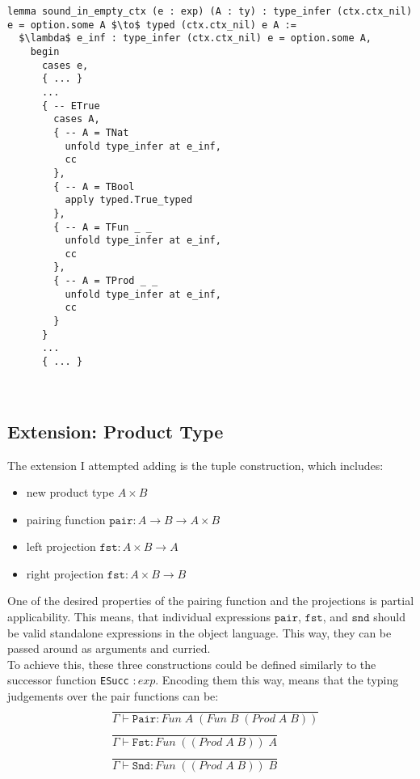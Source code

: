 \documentclass{article}
\newcommand{\tt}[1]{\texttt{#1}}
\begin{document}
\begin{minipage}{\textwidth}
\begin{lstlisting}[mathescape = true, caption={Snippet of the soundness proof in an empty context showing the case for ${\tt{ETrue}}$.}, captionpos=b, label={lst:soundness_etrue}]
lemma sound_in_empty_ctx (e : exp) (A : ty) : type_infer (ctx.ctx_nil) e = option.some A $\to$ typed (ctx.ctx_nil) e A :=
  $\lambda$ e_inf : type_infer (ctx.ctx_nil) e = option.some A,
    begin
      cases e,
      { ... }
      ...
      { -- ETrue
        cases A,
        { -- A = TNat
          unfold type_infer at e_inf,
          cc
        },
        { -- A = TBool
          apply typed.True_typed
        },
        { -- A = TFun _ _
          unfold type_infer at e_inf,
          cc
        },
        { -- A = TProd _ _
          unfold type_infer at e_inf,
          cc
        }
      }
      ...
      { ... }
\end{lstlisting}
\end{minipage} \\


\subsection{Extension: Product Type}
The extension I attempted adding is the tuple construction, which includes:
\begin{itemize}
    \item new product type $A \times B$
    \item pairing function $\texttt{pair} : A \to B \to A \times B$
    \item left projection $\texttt{fst} : A \times B \to A$
    \item right projection $\texttt{fst} : A \times B \to B$
\end{itemize}

One of the desired properties of the pairing function and the projections is partial applicability. This means, that individual expressions $\tt{pair}$, $\tt{fst}$, and $\tt{snd}$ should be valid standalone expressions in the object language. This way, they can be passed around as arguments and curried. \\

To achieve this, these three constructions could be defined similarly to the successor function {\tt{ESucc}} $ : exp$. Encoding them this way, means that the typing judgements over the pair functions can be:
\begin{align*}
    &\dfrac{}{\Gamma \vdash {\tt{Pair}} : Fun \; A \; (Fun \; B \; (Prod \; A \; B)) } \\
    &\dfrac{}{\Gamma \vdash {\tt{Fst}} : Fun \; ((Prod \; A \; B)) \; A}  \\
    &\dfrac{}{\Gamma \vdash {\tt{Snd}} : Fun \; ((Prod \; A \; B)) \; B}
\end{align*}
\end{document}
